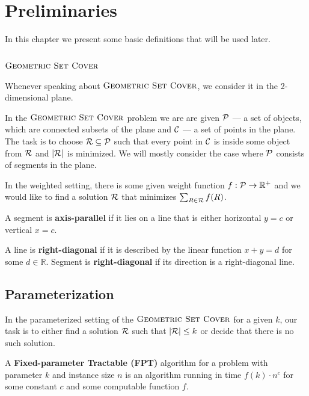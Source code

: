 \chapter{Preliminaries}

In this chapter we present some basic definitions that
will be used later.

\section{$\textsc{Geometric Set Cover}$}
\label{section:def:geometric__set_cover}
Whenever speaking about $\textsc{Geometric Set Cover}$,
we consider it in the 2-dimensional plane.

In the $\textsc{Geometric Set Cover}$ problem we are are given
$\mathcal{P}$ --- a set of objects, which are connected
subsets of the plane and $\mathcal{C}$ --- a set of points in the plane.
The task is to choose $\mathcal{R} \subseteq \mathcal{P}$ such that
every point in $\mathcal{C}$ is inside some object from $\mathcal{R}$
and $|\mathcal{R}|$ is minimized. We will mostly consider the case where
$\mathcal{P}$ consists of segments in the plane.

In the weighted setting, there is some given weight function
$f : \mathcal{P} \rightarrow \mathbb{R^+}$
and we would like to find a solution $\mathcal{R}$
that minimizes $\sum_{R \in \mathcal{R}} f(R)$.

\begin{defi}
A segment is \textbf{axis-parallel} if it lies on a line that is
either horizontal $y = c$ or vertical $x = c$.
\end{defi}

\begin{defi}
	A line is \textbf{right-diagonal} if it is
	described by the linear function $x + y = d$ for some $d \in \mathbb{R}$.
	Segment is \textbf{right-diagonal} if its
	direction is a right-diagonal line.
\end{defi}

\section{Parameterization}

In the parameterized setting of the $\textsc{Geometric Set Cover}$
for a given $k$,
our task is to either find a solution $\mathcal{R}$ such that $|\mathcal{R}| \le k$
or decide that there is no such solution.

\begin{defi}
A \textbf{Fixed-parameter Tractable (FPT)} algorithm 
for a problem with parameter $k$ and instance size $n$
is an algorithm running in time $f(k) \cdot n^c$
for some constant $c$ and some computable function $f$.
\end{defi}

